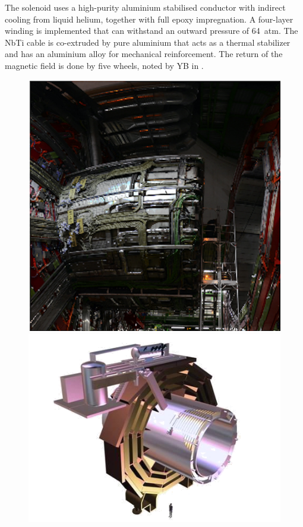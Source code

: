 	The solenoid uses a high-purity aluminium stabilised conductor with indirect cooling from liquid helium, together with full epoxy impregnation. A four-layer winding is implemented that can withstand an outward pressure of 64~atm. The NbTi cable is co-extruded by pure aluminium that acts as a thermal stabilizer and has an aluminium alloy for mechanical reinforcement. The return of the magnetic field is done by five wheels, noted by YB in .
	\begin{figure}[htbp]
		\centering
		\begin{minipage}{0.6\linewidth}
		\includegraphics[width=1.\linewidth]{2_ExperimentalSetup/Figures/solenoid.png}
	\end{minipage}
		\begin{minipage}{0.39\linewidth}
		\includegraphics[width=\linewidth]{2_ExperimentalSetup/Figures/839_1a}

\end{minipage}
\end{figure}
